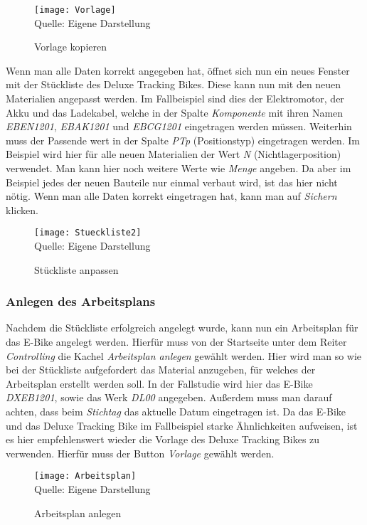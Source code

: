 \begin{figure}[H]
    \caption{Vorlage kopieren}\label{fig:vorlage}
    \texttt{[image: Vorlage]}
    \\
    Quelle: Eigene Darstellung
\end{figure}

Wenn man alle Daten korrekt angegeben hat, öffnet sich nun ein neues Fenster mit der Stückliste des Deluxe Tracking Bikes. Diese kann nun mit den neuen Materialien angepasst werden. 
Im Fallbeispiel sind dies der Elektromotor, der Akku und das Ladekabel, welche in der Spalte \textit{Komponente} mit ihren Namen \textit{EBEN1201}, \textit{EBAK1201} und \textit{EBCG1201} eingetragen werden müssen.
Weiterhin muss der Passende wert in der Spalte \textit{PTp} (Positionstyp) eingetragen werden. Im Beispiel wird hier für alle neuen Materialien der Wert \textit{N} (Nichtlagerposition) verwendet.
Man kann hier noch weitere Werte wie \textit{Menge} angeben. Da aber im Beispiel jedes der neuen Bauteile nur einmal verbaut wird, ist das hier nicht nötig. Wenn man alle Daten korrekt 
eingetragen hat, kann man auf \textit{Sichern} klicken.

\begin{figure}[H]
    \caption{Stückliste anpassen}\label{fig:stueckliste2}
    \texttt{[image: Stueckliste2]}
    \\
    Quelle: Eigene Darstellung
\end{figure}

\subsubsection{Anlegen des Arbeitsplans}
Nachdem die Stückliste erfolgreich angelegt wurde, kann nun ein Arbeitsplan für das E-Bike angelegt werden. Hierfür muss von der Startseite unter dem Reiter \textit{Controlling} die Kachel \textit{Arbeitsplan anlegen} gewählt werden.
Hier wird man so wie bei der Stückliste aufgefordert das Material anzugeben, für welches der Arbeitsplan erstellt werden soll. In der Fallstudie wird hier das E-Bike \textit{DXEB1201}, sowie das Werk \textit{DL00} angegeben. Außerdem 
muss man darauf achten, dass beim \textit{Stichtag} das aktuelle Datum eingetragen ist. Da das E-Bike und das Deluxe Tracking Bike im Fallbeispiel starke Ähnlichkeiten aufweisen, ist es hier empfehlenswert wieder die Vorlage des Deluxe Tracking Bikes zu verwenden.
Hierfür muss der Button \textit{Vorlage} gewählt werden.

\begin{figure}[H]
    \caption{Arbeitsplan anlegen}\label{fig:arbeitsplan}
    \texttt{[image: Arbeitsplan]}
    \\
    Quelle: Eigene Darstellung
\end{figure}


